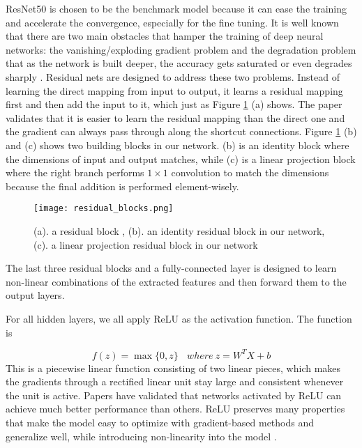  ResNet50 \cite{DBLP:journals/corr/HeZRS15} is chosen to be the benchmark model because it can ease the training and accelerate the convergence, especially for the fine tuning. It is well known that there are two main obstacles that hamper the training of deep neural networks: the vanishing/exploding gradient problem \cite{Bengio:1994:LLD:2325857.2328340, pmlr-v9-glorot10a} and the degradation problem that as the network is built deeper, the accuracy gets saturated or even degrades sharply \cite{DBLP:journals/corr/He014}. Residual nets are designed to address these two problems. Instead of learning the direct mapping from input to output, it learns a residual mapping first and then add the input to it, which just as Figure \ref{figure:residual_blocks} (a) shows. The paper validates that it is easier to learn the residual mapping than the direct one and the gradient can always pass through along the shortcut connections. Figure \ref{figure:residual_blocks} (b) and (c) shows two building blocks in our network. (b) is an identity block where the dimensions of input and output matches, while (c) is a linear projection block where the right branch performs $1\times1$ convolution to match the dimensions because the final addition is performed element-wisely.

\begin{figure}[h]		
	\texttt{[image: residual\_blocks.png]}
	\caption{(a). a residual block \cite{DBLP:journals/corr/HeZRS15}, (b). an identity residual block in our network, (c). a linear projection residual block in our network}
	\centering
	\label{figure:residual_blocks}
\end{figure}

The last three residual blocks and a fully-connected layer is designed to learn non-linear combinations of the extracted features and then forward them to the output layers.

For all hidden layers, we all apply ReLU as the activation function. The function is

\begin{equation}
\label{relu}
f(z) = \max \{0, z\} ~~~~where~ z = W^TX+b
\end{equation}
This is a piecewise linear function consisting of two linear pieces, which makes the gradients through a rectified linear unit stay large and consistent whenever the unit is active. Papers \cite{pmlr-v15-glorot11a, Nair:2010:RLU:3104322.3104425, DBLP:journals/corr/JarrettKGL16} have validated that networks activated by ReLU can achieve much better performance than others. ReLU preserves many properties that make the model easy to optimize with gradient-based methods and generalize well, while introducing non-linearity into the model \cite{Goodfellow-et-al-2016}. 


